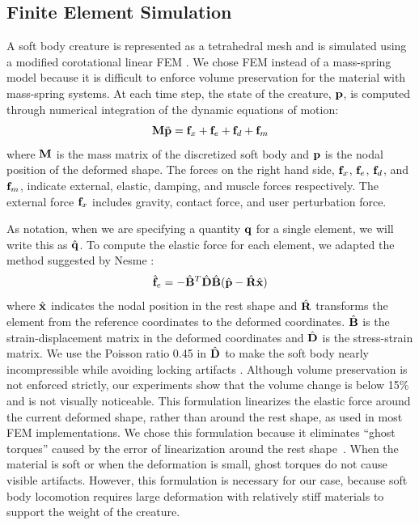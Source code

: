 \subsection{Finite Element Simulation}
A soft body creature is represented as a tetrahedral mesh and
is simulated using a modified corotational linear FEM
\cite{Muller:2002}. We chose FEM instead of a mass-spring model
because it is difficult to enforce volume preservation for the material with mass-spring systems.
At each time step, the state of the creature,
$\mathbf{p}$, is computed through numerical integration of the dynamic
equations of motion:
\begin{equation}
\mathbf{M}\ddot{\mathbf{p}} = \mathbf{f}_{x} + \mathbf{f}_{e}+\mathbf{f}_{d}+\mathbf{f}_{m}
\label{eq:softDynamics}
\end{equation}
where $\mathbf{M}$ is the mass matrix of the discretized soft body and
$\mathbf{p}$ is the nodal position of the deformed shape. The forces on
the right hand side, $\mathbf{f}_{x}$, $\mathbf{f}_{e}$, $\mathbf{f}_{d}$, and
$\mathbf{f}_{m}$, indicate external, elastic, damping, and muscle forces
respectively. The external force $\mathbf{f}_{x}$ includes gravity,
contact force, and user perturbation force.

As notation, when we are specifying a quantity $\mathbf{q}$
for a single element, we will write this as $\hat{\mathbf{q}}$.
To compute the elastic force for each element, we adapted the method
suggested by Nesme \etal \cite{NPF05}:
\begin{equation}
\hat{\mathbf{f}}_e=-\hat{\mathbf{B}}^T\hat{\mathbf{D}}\hat{\mathbf{B}}(\hat{\mathbf{p}}-\hat{\mathbf{R}}\hat{\mathbf{x}})
\end{equation}
where $\hat{\mathbf{x}}$ indicates the nodal position in the rest shape
and $\hat{\mathbf{R}}$ transforms the element from the reference
coordinates to the deformed coordinates. $\hat{\mathbf{B}}$ is the
strain-displacement matrix in the deformed coordinates
and $\hat{\mathbf{D}}$ is the stress-strain matrix. We use the Poisson ratio 0.45 in $\hat{\mathbf{D}}$ to make the soft body
nearly incompressible while avoiding locking artifacts \cite{Irving:2007}. Although volume preservation is not enforced strictly, our experiments show that the volume change is below 15\% and is not visually noticeable.
This formulation linearizes the
elastic force around the current deformed shape, rather than around
the rest shape, as used in most FEM implementations. We chose this
formulation because it eliminates ``ghost torques'' caused by the
error of linearization around the rest shape~\cite{NPF05}. When the material is soft or when the deformation is
small, ghost torques do not cause visible artifacts. However, this
formulation is necessary for our case, because soft body locomotion
requires large deformation with relatively stiff materials to support
the weight of the creature.

